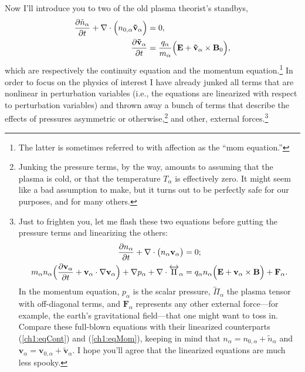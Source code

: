 Now I'll introduce you to two of the old plasma theorist's standbys,
\begin{subequations}
  \begin{align} 
    \dfrac{\partial \tilde n_{\alpha}}{\partial t} + {\bf \nabla} \cdot \Big (n_{0,\alpha} \mathbf{\tilde v}_{\alpha} \Big ) &= 0, \label{ch1:eqCont} \\
    \dfrac{\partial \mathbf{\tilde v}_{\alpha}}{\partial t} &=
    \dfrac{q_{\alpha}}{m_{\alpha}} \Big ( \mathbf{E} + \mathbf{\tilde
      v}_{\alpha} \times \mathbf{B}_0 \Big ), \label{ch1:eqMom}
  \end{align}
\end{subequations}
which are respectively the continuity equation and the momentum
equation.\footnote{The latter is sometimes referred to with affection as the
  ``mom equation.''} In order to focus on the physics of interest I have already
junked all terms that are nonlinear in perturbation variables (i.e., the
equations are linearized with respect to perturbation variables) and thrown away
a bunch of terms that describe the effects of pressures asymmetric or
otherwise,\footnote{Junking the pressure terms, by the way, amounts to assuming
  that the plasma is cold, or that the temperature $T_\alpha$ is effectively
  zero. It might seem like a bad assumption to make, but it turns out to be
  perfectly safe for our purposes, and for many others.}  and other, external
forces.\footnote{Just to frighten you, let me flash these two equations before
  gutting the pressure terms and linearizing the others:
\begin{equation*}
  \begin{aligned} 
    \dfrac{\partial n_{\alpha}}{\partial t} + {\bf \nabla} \cdot \big (n_{\alpha} \mathbf{v}_{\alpha} \big ) &= 0; \\
    m_{\alpha} n_{\alpha} \Big ( \dfrac{\partial \mathbf{v}_{\alpha}}{\partial
      t} + \mathbf{v}_{\alpha} \cdot {\bf \nabla} \mathbf{v}_{\alpha} \Big ) + {\bf \nabla}
    p_{\alpha} + {\bf \nabla} \cdot \overleftrightarrow{\Pi}_{\alpha} &= q_{\alpha}
    n_{\alpha} \Big ( \mathbf{E} + \mathbf{v}_{\alpha} \times \mathbf{B} \Big )
    + \mathbf{F}_{\alpha}.
  \end{aligned}
\end{equation*}
In the momentum equation, $p_\alpha$ is the scalar pressure,
$\overleftrightarrow{\Pi}_{\alpha}$ the plasma tensor with off-diagonal terms,
and $\mathbf{F}_\alpha$ represents any other external force---for example, the
earth's gravitational field---that one might want to toss in. Compare these
full-blown equations with their linearized counterparts (\ref{ch1:eqCont}) and
(\ref{ch1:eqMom}), keeping in mind that $n_\alpha = n_{0,\alpha} + \tilde
n_\alpha$ and $\mathbf{v}_\alpha = \mathbf{v}_{0,\alpha} + \mathbf{\tilde
  v}_\alpha$. I hope you'll agree that the linearized equations are much less
spooky.}

